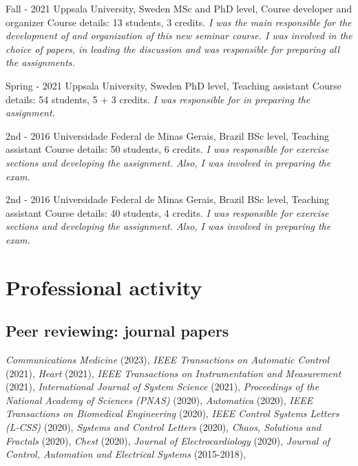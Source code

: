 \documentclass[10pt,letterpaper]{article} %
\begin{document}
    {   Fall - 2021  }
    { Uppsala University, Sweden }
    { MSc and PhD level, Course developer and organizer }
    { Course details: 13 students, 3 credits.  \emph{ I was the main responsible for the development of and organization of this new seminar course. I was involved in the choice of papers, in leading the discussion and was responsible for preparing all the assignments. } }
    
    {   Spring - 2021  }
    { Uppsala University, Sweden }
    { PhD level, Teaching assistant }
    { Course details: 54 students, 5 + 3 credits.  \emph{ I was responsible for in preparing the assignment. } }
    
    {   2nd - 2016  }
    { Universidade Federal de Minas Gerais, Brazil }
    { BSc level, Teaching assistant }
    { Course details: 50 students, 6 credits.  \emph{ I was responsible for exercise sections and developing the assignment. Also, I was involved in preparing the exam. } }
    
    {   2nd - 2016  }
    { Universidade Federal de Minas Gerais, Brazil }
    { BSc level, Teaching assistant }
    { Course details: 40 students, 4 credits.  \emph{ I was responsible for exercise sections and developing the assignment. Also, I was involved in preparing the exam. } }
    




\section*{Professional activity}

\subsection*{Peer reviewing: journal papers}

 {\em Communications Medicine } (2023),  {\em IEEE Transactions on Automatic Control } (2021),  {\em Heart } (2021),  {\em IEEE Transactions on Instrumentation and Measurement } (2021),  {\em International Journal of System Science } (2021),  {\em Proceedings of the National Academy of Sciences (PNAS) } (2020),  {\em Automatica } (2020),  {\em IEEE Transactions on Biomedical Engineering } (2020),  {\em IEEE Control Systems Letters (L-CSS) } (2020),  {\em Systems and Control Letters } (2020),  {\em Chaos, Solutions and Fractals } (2020),  {\em Chest } (2020),  {\em Journal of Electrocardiology } (2020),  {\em Journal of Control, Automation and Electrical Systems } (2015-2018), 
\end{document}
